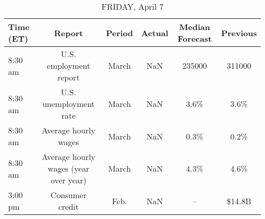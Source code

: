 \documentclass{article}%
\begin{document}
\begin{table}[htbp]%
\caption{FRIDAY, April 7}%
\centering%
\begin{adjustbox}{width=1\textwidth}%
\begin{tabular}{lccccc}
\toprule
Time (ET) &                                Report & Period & Actual & Median Forecast & Previous \\
\midrule
  8:30 am &                U.S. employment report &  March &    NaN &          235000 &   311000 \\
  8:30 am &                U.S. unemployment rate &  March &    NaN &            3.6\% &     3.6\% \\
  8:30 am &                  Average hourly wages &  March &    NaN &            0.3\% &     0.2\% \\
  8:30 am & Average hourly wages (year over year) &  March &    NaN &            4.3\% &     4.6\% \\
  3:00 pm &                       Consumer credit &   Feb. &    NaN &              -- &   \$14.8B \\
\bottomrule
\end{tabular}
%
\end{adjustbox}%
\end{table}
\end{document}
